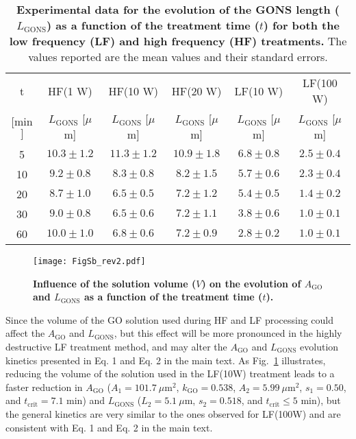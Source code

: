 \begin{table}[h]
 \begin{center}
 \caption{\textbf{Experimental data for the evolution of the GONS length ($L_{\mathrm{GONS}}$) as a function of the treatment time ($t$) for both the low frequency (LF) and high frequency (HF) treatments.} The values reported are the mean values and their standard errors.}
  \label{tblS2_AppB}
  \begin{tabular}{c|c|c|c|c|c}
        \hline
         t & HF(1 W) & HF(10 W) & HF(20 W) & LF(10 W) & LF(100 W) \\
         $[$min$]$ & $L_{\mathrm{GONS}}$ [$\mu$m] & $L_{\mathrm{GONS}}$ [$\mu$m] & $L_{\mathrm{GONS}}$ [$\mu$m] & $L_{\mathrm{GONS}}$ [$\mu$m] & $L_{\mathrm{GONS}}$ [$\mu$m] \\
        \hline
        5 & $10.3 \pm 1.2$ & $11.3 \pm 1.2$ & $10.9\pm 1.8$ & $6.8 \pm 0.8$ & $2.5 \pm 0.4$  \\
        10 & $9.2 \pm 0.8$ & $8.3 \pm 0.8$ & $8.2 \pm 1.5$ & $5.7 \pm 0.6$ & $2.3 \pm 0.4$ \\
        20 & $8.7 \pm 1.0$ & $6.5 \pm 0.5$ & $7.2 \pm 1.2$ & $5.4 \pm 0.5$ & $1.4 \pm 0.2$ \\
        30 & $9.0 \pm 0.8$ & $6.5 \pm 0.6$ & $7.2 \pm 1.1$ & $3.8 \pm 0.6$ & $1.0 \pm 0.1$ \\
        60 & $10.0 \pm 1.0$ & $6.8 \pm 0.6$ & $7.2 \pm 0.9$ & $2.8 \pm 0.2$ & $1.0 \pm 0.1$ \\
        \hline
  \end{tabular}
 \end{center}
\end{table}

\clearpage


\begin{figure}[htp]
  \centering
  \texttt{[image: FigSb\_rev2.pdf]}
  \caption{\textbf{Influence of the solution volume ($V$) on the evolution of $A_{\mathrm{GO}}$ and $L_{\mathrm{GONS}}$ as a function of the treatment time ($t$).}}
  \label{figSb_AppB}
\end{figure}

Since the volume of the GO solution used during HF and LF processing could affect the $A_{\mathrm{GO}}$ and $L_{\mathrm{GONS}}$, but this effect will be more pronounced in the highly destructive LF treatment method, and may alter the $A_{\mathrm{GO}}$ and $L_{\mathrm{GONS}}$ evolution kinetics presented in Eq. 1 and Eq. 2 in the main text. As Fig.~\ref{figSb_AppB} illustrates, reducing the volume of the solution used in the LF(10W) treatment leads to a faster reduction in $A_{\mathrm{GO}}$ ($A_{1} = 101.7\ \mu$m$^{2}$, $k_{\mathrm{GO}} = 0.538$, $A_{2} = 5.99\ \mu$m$^{2}$, $s_{1} = 0.50$, and $t_{\mathrm{crit}} = 7.1$ min) and $L_{\mathrm{GONS}}$ ($L_{2} = 5.1\  \mu$m, $s_{2} = 0.518$,  and $t_{\mathrm{crit}} \leq 5$ min), but the general kinetics are very similar to the ones observed for LF(100W) and are consistent with Eq. 1 and Eq. 2 in the main text.
